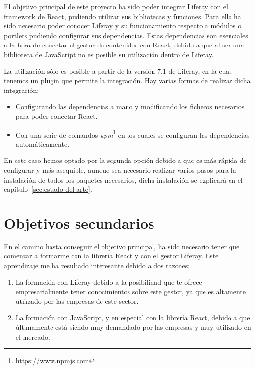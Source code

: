 \documentclass[a4paper, 12pt]{book}
\begin{document}
El objetivo principal de este proyecto ha sido poder integrar Liferay con el framework de React, pudiendo utilizar sus bibliotecas y funciones. Para ello ha sido necesario poder conocer Liferay y su funcionamiento respecto a módulos o portlets pudiendo configurar sus dependencias. Estas dependencias son esenciales a la hora de conectar el gestor de contenidos con React, debido a que al ser una biblioteca de JavaScript no es posible su utilización dentro de Liferay.

La utilización sólo es posible a partir de la versión 7.1 de Liferay, en la cual tenemos un plugin que permite la integración. Hay varias formas de realizar dicha integración:
\begin{itemize}
    \item Configurando las dependencias a mano y modificando los ficheros necesarios para poder conectar React.
    \item Con una serie de comandos \textit{npm}\footnote{\url{https://www.npmjs.com}} en los cuales se configuran las dependencias automáticamente.
\end{itemize}

En este caso hemos optado por la segunda opción debido a que es más rápida de configurar y más asequible, aunque sea necesario realizar varios pasos para la instalación de todos los paquetes necesarios, dicha instalación se explicará en el capítulo~\ref{sec:estado-del-arte}.

\section{Objetivos secundarios}
\label{sec:objetivos-secundarios}
En el camino hasta conseguir el objetivo principal, ha sido necesario tener que comenzar a formarme con la librería React y con el gestor Liferay. Este aprendizaje me ha resultado interesante debido a dos razones:

\begin{enumerate}
    \item La formación con Liferay debido a la posibilidad que te ofrece empresarialmente tener conocimientos sobre este gestor, ya que es altamente utilizado por las empresas de este sector.
    \item La formación con JavaScript, y en especial con la librería React, debido a que últimamente está siendo muy demandado por las empresas y muy utilizado en el mercado.
    
\end{enumerate}
\end{document}
